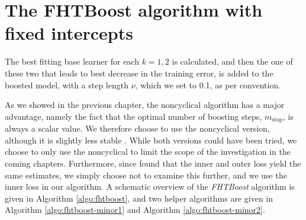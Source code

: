\section{The FHTBoost algorithm with fixed intercepts}
The best fitting base learner for each $k=1,2$ is calculated, and then the one of these two that leads to best decrease in the training error, is added to the boosted model, with a step length $\nu$, which we set to 0.1, as per convention.

As we showed in the previous chapter, the noncyclical algorithm has a major advantage, namely the fact that the optimal number of boosting steps, $m_{\text{stop}}$, is always a scalar value.
We therefore choose to use the noncyclical version, although it is slightly less stable \citep{thomas2018}.
While both versions could have been tried, we choose to only use the noncyclical to limit the scope of the investigation in the coming chapters.
Furthermore, since \citet{thomas2018} found that the inner and outer loss yield the same estimates, we simply choose not to examine this further, and we use the inner loss in our algorithm.
A schematic overview of the \textit{FHTBoost} algorithm is given in Algorithm \ref{algo:fhtboost}, and two helper algorithms are given in Algorithm \ref{algo:fhtboost-minor1} and Algorithm \ref{algo:fhtboost-minor2}.

